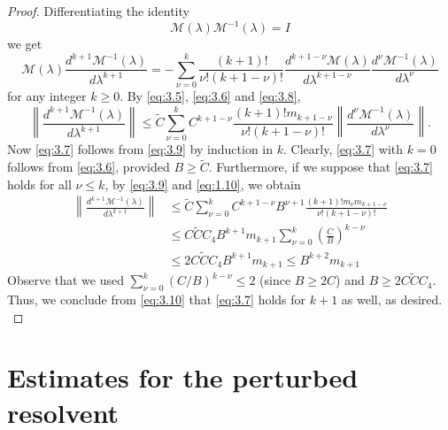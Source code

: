 \documentclass[11pt]{amsart}
\numberwithin{equation}{section}
\begin{document}
\begin{proof} 
Differentiating the identity
\begin{equation*}
\mathcal{M}(\lambda)\mathcal{M}^{-1}(\lambda)=I
 \end{equation*}
 we get
 \begin{equation}\label{eq:3.8}
 \mathcal{M}(\lambda)\frac{d^{k+1}\mathcal{M}^{-1}(\lambda)}{d\lambda^{k+1}}=-\sum_{\nu=0}^k\frac{(k+1)!}{\nu!(k+1-\nu)!}\frac{d^{k+1-\nu} \mathcal{M}(\lambda)}{d\lambda^{k+1-\nu}}
\frac{d^{\nu}\mathcal{M}^{-1}(\lambda)}{d\lambda^{\nu}}
 \end{equation}
 for any integer $k\ge 0$. By \eqref{eq:3.5}, \eqref{eq:3.6} and \eqref{eq:3.8},
 \begin{equation}\label{eq:3.9}
 \left\|\frac{d^{k+1}\mathcal{M}^{-1}(\lambda)}{d\lambda^{k+1}}\right\|\le \tilde C \sum_{\nu=0}^kC^{k+1-\nu}\frac{(k+1)! m_{k+1-\nu}}{\nu!(k+1-\nu)!}
\left\|\frac{d^{\nu}\mathcal{M}^{-1}(\lambda)}{d\lambda^{\nu}}\right\|.
 \end{equation}
 Now \eqref{eq:3.7} follows from \eqref{eq:3.9} by induction in $k$. Clearly, \eqref{eq:3.7} with $k=0$ follows from \eqref{eq:3.6},
 provided $B\ge\widetilde C$. 
 Furthermore, if we suppose that \eqref{eq:3.7} holds for all $\nu\le k$, by
 \eqref{eq:3.9} and \eqref{eq:1.10}, we obtain 
 \begin{equation}\label{eq:3.10}
 \begin{split}
 \left\|\frac{d^{k+1}\mathcal{M}^{-1}(\lambda)}{d\lambda^{k+1}}\right\|&\le \tilde C
 \sum_{\nu=0}^kC^{k+1-\nu}B^{\nu+1}\frac{(k+1)!m_\nu m_{k+1-\nu}}{\nu!(k+1-\nu)!}\\
 &\le  C\tilde C C_4 B^{k+1}m_{k+1} \sum_{\nu=0}^k \left( \frac{C}{B} \right)^{k-\nu}\\
  &\le 2 C\tilde C C_4 B^{k+1}m_{k+1} \le B^{k+2}m_{k+1}
 \end{split}
\end{equation}
Observe that we used $\sum_{\nu = 0}^{k} (C/B)^{k - \nu} \le 2$ (since $B\ge 2C$) and $B \ge 2C \tilde C C_4$. Thus, we conclude from 
\eqref{eq:3.10} that \eqref{eq:3.7} holds for $k+1$ as well, as desired. \\
 \end{proof}
 
\section{Estimates for the perturbed resolvent} \label{perturbed resolvent section}
\end{document}
